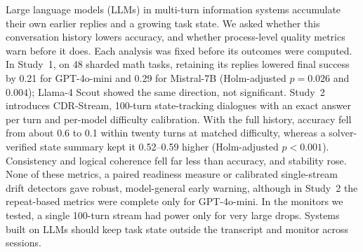 Large language models (LLMs) in multi-turn information systems accumulate
their own earlier replies and a growing task state. We asked whether this
conversation history lowers accuracy, and whether process-level quality
metrics warn before it does. Each analysis was fixed before its outcomes were
computed. In Study~1, on 48 sharded math tasks, retaining its replies
lowered final success by 0.21 for GPT-4o-mini and 0.29 for Mistral-7B
(Holm-adjusted $p=0.026$ and $0.004$); Llama-4 Scout showed the same
direction, not significant. Study~2 introduces CDR-Stream, 100-turn
state-tracking dialogues with an exact answer per turn and per-model
difficulty calibration. With the full history, accuracy fell from about 0.6 to
0.1 within twenty turns at matched difficulty, whereas a solver-verified state
summary kept it 0.52--0.59 higher (Holm-adjusted $p<0.001$). Consistency and
logical coherence fell far less than accuracy, and stability rose. None
of these metrics, a paired readiness measure or calibrated single-stream drift
detectors gave robust, model-general early warning, although in Study~2 the
repeat-based metrics were complete only for GPT-4o-mini. In the monitors we
tested, a single 100-turn stream had power only for very large drops. Systems
built on LLMs should keep task state outside the transcript and monitor across
sessions.
